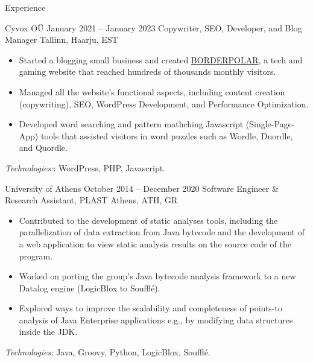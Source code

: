\documentclass{resume}
\begin{document}
\begin{rSection}{Experience}
  \begin{rSubsection}
    {Cyvox OÜ}
    {January 2021 -- January 2023}
    {Copywriter, SEO, Developer, and Blog Manager}
    {Tallinn, Haarju, EST}
    \begin{itemize}[label={-}]
      \setlength\itemsep{-0.5em}
        \item Started a blogging small business and created \href{http://borderpolar.com}{BORDERPOLAR}, a tech and gaming website that reached hundreds of thousands monthly visitors.
        \item Managed all the website's functional aspects, including content creation (copywriting), SEO, WordPress Development, and Performance Optimization.
        \item Developed word searching and pattern mathching Javascript (Single-Page-App) tools that assisted visitors in word puzzles such as Wordle, Duordle, and Quordle.
    \end{itemize}
  \footnotesize\textcolor{TechsColor}{\textit{Technologies:}: WordPress, PHP, Javascript.}\\
  \end{rSubsection}

\begin{rSubsection}
  {University of Athens}
  {October 2014 -- December 2020}
  {Software Engineer \& Research Assistant, PLAST}
  {Athens, ATH, GR}
  \begin{itemize}[label={-}]
    \setlength\itemsep{-0.5em}
    \item Contributed to the development of static analyses tools, including the parallelization of data extraction from Java bytecode and the development of a web application to view static analysis results on the source code of the program.
    \item Worked on porting the group's Java bytecode analysis framework to a new Datalog engine (LogicBlox to Soufflé).
    \item Explored ways to improve the scalability and completeness of points-to analysis of Java Enterprise applications e.g., by modifying data structures inside the JDK.
  \end{itemize}
\footnotesize\textcolor{TechsColor}{\textit{Technologies:} Java, Groovy, Python, LogicBlox, Soufflé.}\\
\end{rSubsection}


\end{rSection}
\end{document}
